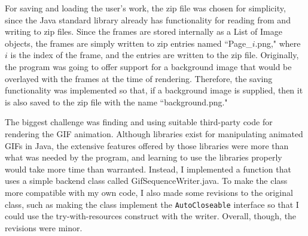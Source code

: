 \documentclass[10 pt]{scrartcl}
\begin{document}
For saving and loading the user's work, the zip file was chosen for simplicity, since the Java standard library already has functionality for reading from and writing to zip files. Since the frames are stored internally as a List of Image objects, the frames are simply written to zip entries named ``Page\_$i$.png," where $i$ is the index of the frame, and the entries are written to the zip file. Originally, the program was going to offer support for a background image that would be overlayed with the frames at the time of rendering. Therefore, the saving functionality was implemented so that, if a background image is supplied, then it is also saved to the zip file with the name ``background.png."

The biggest challenge was finding and using suitable third-party code for rendering the GIF animation. Although libraries exist for manipulating animated GIFs in Java, the extensive features offered by those libraries were more than what was needed by the program, and learning to use the libraries properly would take more time than warranted. Instead, I implemented a function that uses a simple backend class called GifSequenceWriter.java. To make the class more compatible with my own code, I also made some revisions to the original class, such as making the class implement the \verb|AutoCloseable| interface so that I could use the try-with-resources construct with the writer. Overall, though, the revisions were minor.

%
\end{document}
